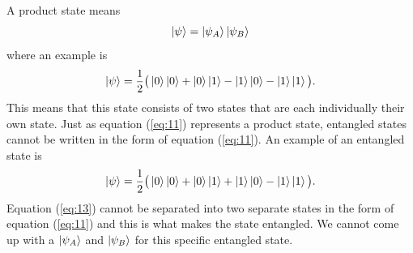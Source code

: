 \documentclass[twocolumn]{article}
\begin{document}
A product state means
\begin{equation}\label{eq:11}
\ket{\psi}=\ket{\psi_A}\ket{\psi_B}
\end{equation}
where an example is
\begin{equation}\label{eq:12}
\ket{\psi}=\frac{1}{2}\big(\ket{0}\ket{0}+\ket{0}\ket{1}-\ket{1}\ket{0}-\ket{1}\ket{1}\big).
\end{equation}
This means that this state consists of two states that are each individually their own state. Just as equation (\ref{eq:11}) represents a product state, entangled states cannot be written in the form of equation (\ref{eq:11}). An example of an entangled state is
\begin{equation}\label{eq:13}
\ket{\psi}=\frac{1}{2}\big(\ket{0}\ket{0}+\ket{0}\ket{1}+\ket{1}\ket{0}-\ket{1}\ket{1}\big).
\end{equation}
Equation (\ref{eq:13}) cannot be separated into two separate states in the form of equation (\ref{eq:11}) and this is what makes the state entangled. We cannot come up with a $\ket{\psi_A}$ and $\ket{\psi_B}$ for this specific entangled state.
\end{document}
